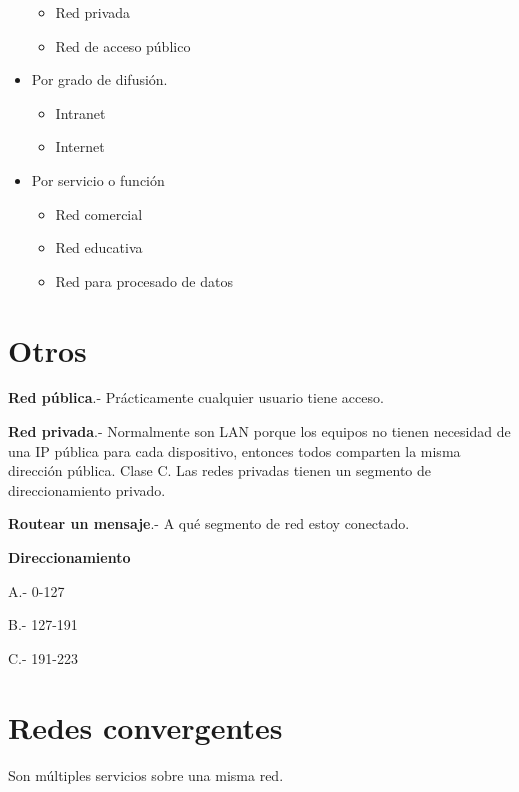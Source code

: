 \documentclass{article}
\begin{document}
\begin{itemize}
		\begin{itemize}
			\item
			Red privada
			\item
			Red de acceso público
		\end{itemize}
	\item
		Por grado de difusión.

		\begin{itemize}
			\item
			Intranet
			\item
			Internet
		\end{itemize}
	\item
		Por servicio o función

		\begin{itemize}
			\item
			Red comercial
			\item
			Red educativa
			\item
			Red para procesado de datos
		\end{itemize}
\end{itemize}

\section{Otros}

\textbf{Red pública}.- Prácticamente cualquier usuario tiene acceso.
\vspace{1em}

\textbf{Red privada}.- Normalmente son LAN porque los equipos no tienen necesidad
de una IP pública para cada dispositivo, entonces todos comparten la misma
dirección pública. Clase C. Las redes privadas tienen un segmento de
direccionamiento privado.
\vspace{1em}

\textbf{Routear un mensaje}.- A qué segmento de red estoy conectado.
\vspace{1em}

\textbf{Direccionamiento}
\vspace{1em}

A.- 0-127

B.- 127-191

C.- 191-223

\section{Redes convergentes}

Son múltiples servicios sobre una misma red.
\vspace{1em}
\end{document}
